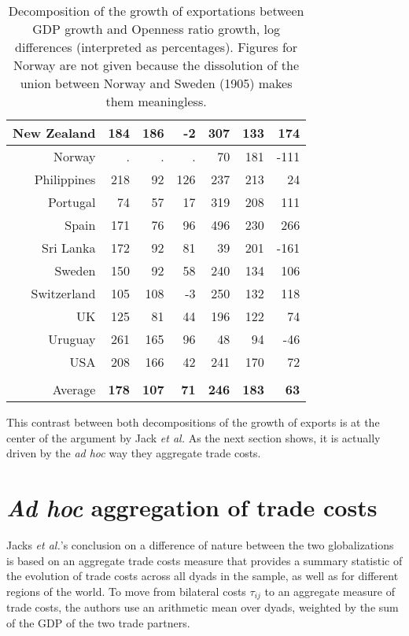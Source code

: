 \documentclass{article}
\begin{document}
\begin{table}
\begin{tabular}{|r|r|r|r|r|r|r|}
\hline
New Zealand & 184 & 186 & -2 & 307 & 133 & 174\\
\hline
Norway & . & . & . & 70 & 181 & -111\\
\hline
Philippines & 218 & 92 & 126 & 237 & 213 & 24\\
\hline
Portugal & 74 & 57 & 17 & 319 & 208 & 111\\
\hline
Spain & 171 & 76 & 96 & 496 & 230 & 266\\
\hline
Sri Lanka & 172 & 92 & 81 & 39 & 201 & -161\\
\hline
Sweden & 150 & 92 & 58 & 240 & 134 & 106\\
\hline
Switzerland & 105 & 108 & -3 & 250 & 132 & 118\\
\hline
UK & 125 & 81 & 44 & 196 & 122 & 74\\
\hline
Uruguay & 261 & 165 & 96 & 48 & 94 & -46\\
\hline
USA & 208 & 166 & 42 & 241 & 170 & 72\\
\hline
 &  &  &  &  &  & \\
\hline
Average & \textbf{178} & \textbf{107} & \textbf{71} & \textbf{246} & \textbf{183} & \textbf{63}\\
\hline
\end{tabular}
\caption{Decomposition of the growth of exportations between
GDP growth and Openness ratio growth, log differences (interpreted as percentages).
Figures for Norway are not given because the dissolution of the
union between Norway and Sweden (1905) makes them
meaningless.}\label{OR}
\end{table}

This contrast between both decompositions of the growth of exports is at the center of the argument by Jack \textit{et al.} As the next section shows, it is actually driven by the \textit{ad hoc} way they aggregate trade costs.

\section{\label{2} \textit{Ad hoc} aggregation of trade costs}

Jacks \textit{et al.}'s conclusion on a difference of nature between the
two globalizations is based on an aggregate trade costs
measure that provides a summary statistic of the
evolution of trade costs across all dyads in the sample, as
well as for different regions of the world. To move from
bilateral costs $\tau_{ij}$ to an aggregate measure of trade
costs, the authors use an arithmetic mean over dyads, weighted
by the sum of the GDP of the two trade partners.
\end{document}
